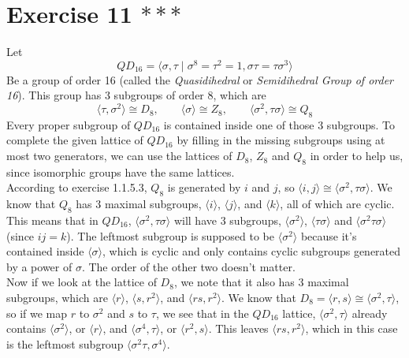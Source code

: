 \documentclass[12pt]{article}
\begin{document}
    \section*{Exercise 11 $***$}
    Let
    \[ QD_{16} = \langle \sigma, \tau \mid \sigma^8 = \tau^2 = 1,
    \sigma\tau = \tau\sigma^3 \rangle \] 
    Be a group of order 16
    (called the \textit{Quasidihedral} or \textit{Semidihedral
    Group of order 16}).
    This group has 3 subgroups of order 8,
    which are
    \[ \langle \tau, \sigma^2 \rangle \cong D_8, \qquad
    \langle \sigma \rangle \cong Z_8, \qquad
    \langle \sigma^2, \tau\sigma \rangle \cong Q_8 \]
    Every proper subgroup of $QD_{16}$ is contained inside one of those
    3 subgroups.
    To complete the given lattice of $QD_{16}$ by filling in the missing
    subgroups using at most two generators,
    we can use the lattices of $D_8$, $Z_8$ and $Q_8$
    in order to help us,
    since isomorphic groups have the same lattices. \\
    According to exercise 1.1.5.3,
    $Q_8$ is generated by $i$ and $j$,
    so $\langle i, j \rangle \cong \langle \sigma^2, \tau\sigma \rangle$.
    We know that $Q_8$ has 3 maximal subgroups,
    $\langle i \rangle$, $\langle j \rangle$, and $\langle k \rangle$,
    all of which are cyclic.
    This means that in $QD_{16}$,
    $\langle \sigma^2, \tau\sigma \rangle$
    will have 3 subgroups,
    $\langle \sigma^2 \rangle$,
    $\langle \tau\sigma \rangle$
    and 
    $\langle \sigma^2\tau\sigma \rangle$
    (since $ij = k$).
    The leftmost subgroup is supposed to be $\langle \sigma^2 \rangle$
    because it's contained inside $\langle \sigma \rangle$,
    which is cyclic and only contains cyclic subgroups generated
    by a power of $\sigma$.
    The order of the other two doesn't matter. \\
    Now if we look at the lattice of $D_8$,
    we note that it also has 3 maximal subgroups,
    which are $\langle r \rangle$,
    $\langle s, r^2 \rangle$, 
    and $\langle rs, r^2 \rangle$.
    We know that
    $D_8 = \langle r, s \rangle \cong \langle \sigma^2, \tau \rangle$,
    so if we map $r$ to $\sigma^2$ and $s$ to $\tau$,
    we see that in the $QD_{16}$ lattice,
    $\langle \sigma^2, \tau \rangle$
    already contains $\langle \sigma^2\rangle$, or $\langle r \rangle$,
    and $\langle \sigma^4, \tau \rangle$, or $\langle r^2, s \rangle$.
    This leaves $\langle rs, r^2  \rangle$,
    which in this case is the leftmost subgroup
    $\langle \sigma^2\tau, \sigma^4 \rangle$. \\
\end{document}
